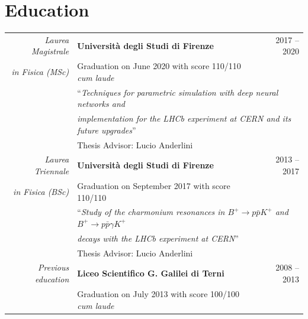 \documentclass[a4, 11pt]{report}
\begin{document}
    \section*{Education}
        \begin{tabular*}{\textwidth}{rl @{\extracolsep{\fill}} r}
            \textit{Laurea Magistrale}  
            & {\textbf {Università degli Studi di Firenze}}
            & {\small 2017 -- 2020}\\
            \textit{in Fisica (MSc)}
            & {\small Graduation on June 2020 with score 110/110 \textit{cum laude}}\\ [1.5mm]
            & \multicolumn{2}{l}{``\textit{Techniques for parametric simulation with deep neural networks and}}\\
            & \multicolumn{2}{l}{\textit{implementation for the LHCb experiment at CERN and its future upgrades}''}\\
            & {\small Thesis Advisor: Lucio Anderlini}\\ [3mm]
            
            \textit{Laurea Triennale}   
            & {\textbf {Università degli Studi di Firenze}}
            & {\small 2013 -- 2017}\\
            \textit{in Fisica (BSc)}    
            & {\small Graduation on September 2017 with score 110/110}\\ [1.5mm]
            & \multicolumn{2}{l}{``\textit{Study of the charmonium resonances in $B^+ \to p \bar{p} K^+$ and $B^+ \to p \bar{p} \gamma K^+$}}\\
            & \multicolumn{2}{l}{\textit{ decays with the LHCb experiment at CERN}''}\\
            & {\small Thesis Advisor: Lucio Anderlini}\\ [3mm]
                                        
            \textit{Previous education} 
            & {\textbf {Liceo Scientifico G. Galilei di Terni}}
            & {\small 2008 -- 2013}\\
            & {\small Graduation on July 2013 with score 100/100 \textit{cum laude}}
        \end{tabular*}
        
    \pagebreak

\end{document}
